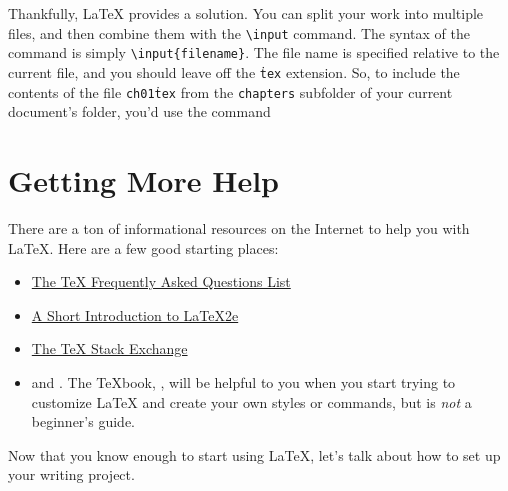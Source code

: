 Thankfully, \LaTeX{} provides a solution. You can split your work into multiple
files, and then combine them with the \texttt{\textbackslash{}input{}} command. The syntax
of the command is simply \texttt{\textbackslash{}input\{filename\}}. The file
name is specified relative to the current file, and you should leave off the
\texttt{\.tex} extension. So, to include the contents of the file
\texttt{ch01\.tex} from the \texttt{chapters} subfolder of your current document's
folder, you'd use the command


\section{Getting More Help} \label{sec:resources}

There are a ton of informational resources on the Internet to help you with
\LaTeX{}. Here are a few good starting places:

\begin{itemize}
\item \href{https://texfaq.org}{The \TeX{} Frequently Asked Questions List}
\item \href{https://www.ctan.org/tex-archive/info/lshort/}{A Short
    Introduction to \LaTeX2e{}}
\item \href{https://tex.stackexchange.com}{The \TeX{} Stack Exchange}
\item \cite{latex2e} and \cite{texbook}. The \TeX{}book, \cite{texbook}, will
  be helpful to you when you start trying to customize \LaTeX{} and create
  your own styles or commands, but is \emph{not} a beginner's guide.
\end{itemize}

Now that you know enough to start using \LaTeX{}, let's talk about how to set
up your writing project.

